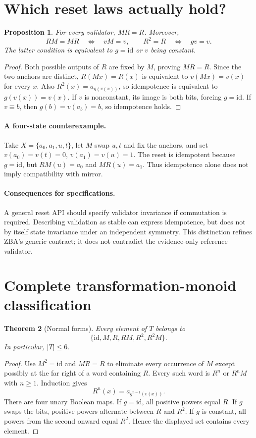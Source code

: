 \documentclass[11pt,a4paper]{article}
\newtheorem{theorem}{Theorem}[section]
\newtheorem{proposition}[theorem]{Proposition}
\newcommand{\id}{\mathrm{id}}
\begin{document}
\section{Which reset laws actually hold?}
\begin{proposition}\label{prop:laws}
For every validator, $MR=R$. Moreover,
\[
 RM=MR\quad\Longleftrightarrow\quad vM=v,
 \qquad
 R^2=R\quad\Longleftrightarrow\quad gv=v.
\]
The latter condition is equivalent to $g=\id$ or $v$ being constant.
\end{proposition}
\begin{proof}
Both possible outputs of $R$ are fixed by $M$, proving $MR=R$. Since the two anchors are distinct, $R(Mx)=R(x)$ is equivalent to $v(Mx)=v(x)$ for every $x$. Also $R^2(x)=a_{g(v(x))}$, so idempotence is equivalent to $g(v(x))=v(x)$. If $v$ is nonconstant, its image is both bits, forcing $g=\id$. If $v\equiv b$, then $g(b)=v(a_b)=b$, so idempotence holds.
\end{proof}

\paragraph{A four-state counterexample.}
Take $X=\{a_0,a_1,u,t\}$, let $M$ swap $u,t$ and fix the anchors, and set $v(a_0)=v(t)=0$, $v(a_1)=v(u)=1$. The reset is idempotent because $g=\id$, but $RM(u)=a_0$ and $MR(u)=a_1$. Thus idempotence alone does not imply compatibility with mirror.

\paragraph{Consequences for specifications.}
A general reset API should specify validator invariance if commutation is required. Describing validation as stable can express idempotence, but does not by itself state invariance under an independent symmetry. This distinction refines ZBA's generic contract; it does not contradict the evidence-only reference validator.

\section{Complete transformation-monoid classification}
\begin{theorem}[Normal forms]\label{thm:normal}
Every element of $T$ belongs to
\[
 \{\id,M,R,RM,R^2,R^2M\}.
\]
In particular, $|T|\leq6$.
\end{theorem}
\begin{proof}
Use $M^2=\id$ and $MR=R$ to eliminate every occurrence of $M$ except possibly at the far right of a word containing $R$. Every such word is $R^n$ or $R^nM$ with $n\geq1$. Induction gives
\[
 R^n(x)=a_{g^{n-1}(v(x))}.
\]
There are four unary Boolean maps. If $g=\id$, all positive powers equal $R$. If $g$ swaps the bits, positive powers alternate between $R$ and $R^2$. If $g$ is constant, all powers from the second onward equal $R^2$. Hence the displayed set contains every element.
\end{proof}
\end{document}
